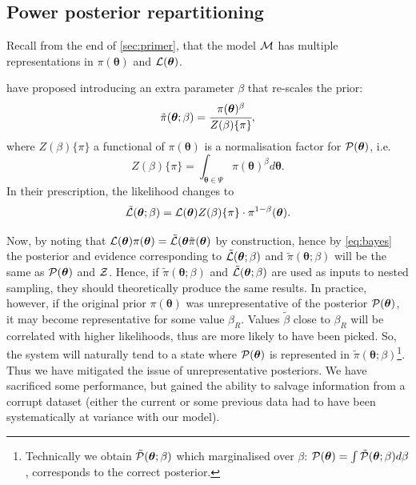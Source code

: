 \documentclass[usenatbib]{mnras}
\begin{document}
\subsection{Power posterior repartitioning}\label{sec:autopr}

Recall from the end of \cref{sec:primer}, that the model ${\cal M}$
has multiple representations in \(\pi (\bm{\theta})\) and
\({\cal L}(\bm{\theta})\).

\citeauthor{chen-ferroz-hobson} have proposed introducing an
extra parameter \(\beta\) that re-scales the prior:
\begin{equation}
  \tilde{\pi}(\bm{\bm{\theta}};\beta) = \cfrac{\pi(\bm{\theta})^{\beta}}{Z(\beta)\{\pi\}},
\end{equation}
where \(Z(\beta)\{\pi\}\) a functional of \(\pi (\bm{\theta})\) is a
normalisation factor for \( {\cal P} (\bm{\theta})\), i.e.
\begin{equation}
  Z(\beta)\{\pi\} = \int_{\bm{\theta} \in \Psi} \pi(\bm{\bm{\theta}})^{\beta}d\bm{\bm{\theta}}.
\end{equation}
In their prescription, the likelihood changes to
\begin{equation}
  \tilde{\cal L}(\bm{\theta}; \beta) = {\cal L}(\bm{\theta}) Z(\beta)\{\pi\} \cdot \pi^{1-\beta}(\bm{\theta}).
\end{equation}

Now, by noting that
\({\cal L}(\bm{\theta})\pi (\bm{\theta}) = \tilde{\cal L}(\bm{\theta}
\tilde{\pi} (\bm{\theta})\) by construction, hence by \cref{eq:bayes}
the posterior and evidence corresponding to
\(\tilde{\cal L}(\bm{\theta};\beta)\) and
\(\tilde{\pi} (\bm{\theta};\beta)\) will be the same as
\( {\cal P} (\bm{\theta})\) and \({\cal Z}\). Hence, if
\(\tilde{\pi} (\bm{\theta};\beta)\) and
\(\tilde{\cal L}(\bm{\theta};\beta)\) are used as inputs to nested
sampling, they should theoretically produce the same results. In
practice, however, if the original prior \(\pi (\bm{\theta})\) was
unrepresentative of the posterior \( {\cal P} (\bm{\theta})\), it may
become representative for some value $\beta_{R}$. Values
$\tilde{\beta}$ close to $\beta_{R}$ will be correlated with higher
likelihoods, thus are more likely to have been picked. So, the system
will naturally tend to a state where \( {\cal P} (\bm{\theta})\) is
represented in
\(\tilde{\pi} (\bm{\theta};\beta)\)\footnote{Technically we obtain
  \( \tilde{\cal P} (\bm{\theta};\beta)\) which marginalised over
  $\beta$:
  \( {\cal P} (\bm{\theta}) = \int \tilde{\cal P} (\bm{\theta};\beta)
  d \beta\), corresponds to the correct posterior.}. Thus we have
mitigated the issue of unrepresentative posteriors. We have sacrificed
some performance, but gained the ability to salvage information from a
corrupt dataset (either the current or some previous data had to have
been systematically at variance with our model).
\end{document}
